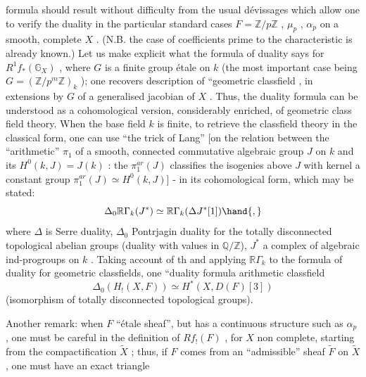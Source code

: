 
formula should result without difficulty from the usual dévissages which
allow one to verify the duality in the particular standard cases $F = \mathbb{Z}/p\mathbb{Z}$ ,
$\mu_p$ , $\alpha_p$ on a smooth, complete $X$ . (N.B. the case of coefficients prime
to the characteristic is already known.) Let us make explicit what the
formula of duality says for $R^1 f_*(\mathbb{G}_X)$ , where $G$ is a finite group étale
on $k$ (the most important case being $G = (\mathbb{Z}/p^m\mathbb{Z})_k$ ); one recovers  
description  of ``geometric classfield , in   extensions
by $G$ of a generalised jacobian of $X$ . Thus, the duality formula can be
understood as a cohomological version, considerably enriched, of geometric
class field theory. When the base field $k$ is finite, to retrieve the
classfield theory in the classical form, one can use ``the trick of Lang''
[on the relation between the ``arithmetic'' $\pi_1$ of a smooth, connected
commutative algebraic group $J$ on $k$ and its $H^0(k, J) = J(k)$ : the $\pi_1^{ar}(J)$
classifies the isogenies above $J$ with kernel a constant group
$\pi_1^{ar}(J) \simeq H^0(k, J)$] - in its cohomological form, which may be stated:
\[ \Delta_0 \mathbb{R}\Gamma_k(J^*) \simeq \mathbb{R}\Gamma_k(\Delta J^*[1]) \hand{,} \]
where $\Delta$ is Serre duality, $\Delta_0$ Pontrjagin duality for the totally disconnected
topological abelian groups (duality with values in $\mathbb{Q}/\mathbb{Z}$)\hand{)}, $J^*$ a complex of
algebraic ind-progroups on $k$ . Taking account of th  
and applying $\mathbb{R}\Gamma_k$ to the formula of duality for geometric classfields, one 
  ``duality formula  arithmetic classfield \hand{:}
\[ \Delta_0(H_!(X, F)) \simeq H^*(X, D(F)[3]) \]
(isomorphism of totally disconnected topological groups).

Another remark: when $F$   ``étale sheaf'', but has a
continuous structure such as $\alpha_p$ , one must be careful in the definition of
$Rf_!(F)$ , for $X$ non complete, starting from the compactification $\tilde{X}$ ; thus,
if $F$ comes from an ``admissible'' sheaf $\tilde{F}$ on $\tilde{X}$ , one must have an exact
triangle

